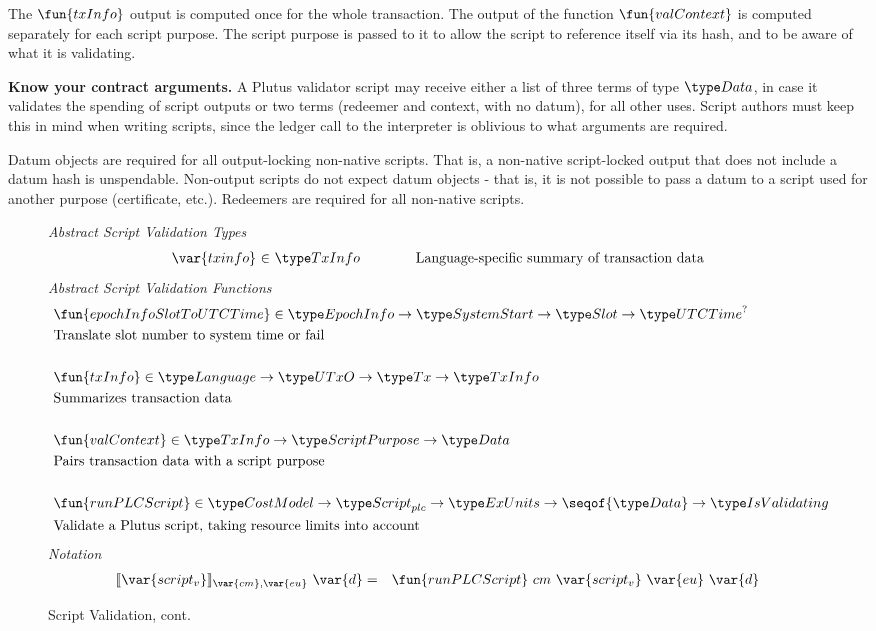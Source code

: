   The $\fun{txInfo}$ output is computed once for the whole transaction. The output of the function
  $\fun{valContext}$ is computed separately for each script purpose.
  The script purpose is passed to it
  to allow the script to reference itself via its hash, and to be aware of what it is validating.

\textbf{Know your contract arguments.}
  A Plutus validator script may receive either a list of three terms of type $\Data$, in case it validates the spending of script outputs
  or two terms (redeemer and context, with no datum), for all other uses.
  Script authors must keep this in mind when writing scripts, since the ledger call to the interpreter is oblivious to what
  arguments are required.

  Datum objects are required for all output-locking non-native scripts. That is, a
  non-native script-locked output that does not include a datum hash is unspendable.
  Non-output scripts do not expect datum objects - that is, it is not possible to pass
  a datum to a script used for another purpose (certificate, etc.). Redeemers
  are required for all non-native scripts.

\begin{figure*}[htb]
  \emph{Abstract Script Validation Types}
  \begin{equation*}
    \begin{array}{r@{~\in~}l@{\quad\quad\quad\quad}r}
      \var{txinfo} &\TxInfo & \text{Language-specific summary of transaction data}\\
    \end{array}
  \end{equation*}
  \emph{Abstract Script Validation Functions}
  \begin{align*}
     &\fun{epochInfoSlotToUTCTime} \in \EpochInfo \to \SystemStart \to \Slot \to \UTCTime^? \\
     &\text{Translate slot number to system time or fail} \\~\\
     &\fun{txInfo} \in \Language \to \UTxO \to \Tx \to \TxInfo \\
     &\text{Summarizes transaction data} \\~\\
     &\fun{valContext} \in \TxInfo \to \ScriptPurpose \to \Data \\
     &\text{Pairs transaction data with a script purpose} \\~\\
     &\fun{runPLCScript} \in \CostMod \to\ScriptPlutus \to \ExUnits \to
    \seqof{\Data} \to \IsValidating \\
     &\text{Validate a Plutus script, taking resource limits into account}
  \end{align*}
  \emph{Notation}
  \begin{align*}
    \llbracket \var{script_v} \rrbracket_{\var{cm},\var{eu}}~\var{d}
    &=& \fun{runPLCScript} ~{cm}~\var{script_v}~\var{eu}~\var{d}
  \end{align*}
  \caption{Script Validation, cont.}
  \label{fig:defs:functions-valid}
\end{figure*}

